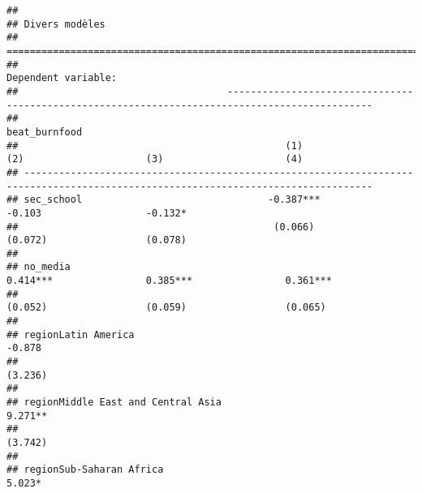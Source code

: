 \documentclass[
]{article}
\begin{document}
\begin{verbatim}
## 
## Divers modèles
## ==================================================================================================================================
##                                                                          Dependent variable:                                      
##                                    -----------------------------------------------------------------------------------------------
##                                                                             beat_burnfood                                         
##                                              (1)                     (2)                     (3)                     (4)          
## ----------------------------------------------------------------------------------------------------------------------------------
## sec_school                                -0.387***                                        -0.103                  -0.132*        
##                                            (0.066)                                         (0.072)                 (0.078)        
##                                                                                                                                   
## no_media                                                          0.414***                0.385***                0.361***        
##                                                                    (0.052)                 (0.059)                 (0.065)        
##                                                                                                                                   
## regionLatin America                                                                                                -0.878         
##                                                                                                                    (3.236)        
##                                                                                                                                   
## regionMiddle East and Central Asia                                                                                 9.271**        
##                                                                                                                    (3.742)        
##                                                                                                                                   
## regionSub-Saharan Africa                                                                                           5.023*         

\end{verbatim}
\end{document}

